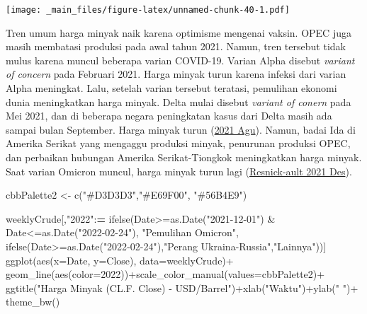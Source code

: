 \documentclass[
]{book}
\newenvironment{Shaded}{\begin{snugshade}}{\end{snugshade}}
\newcommand{\AttributeTok}[1]{\textcolor[rgb]{0.77,0.63,0.00}{#1}}
\newcommand{\ErrorTok}[1]{\textcolor[rgb]{0.64,0.00,0.00}{\textbf{#1}}}
\newcommand{\FunctionTok}[1]{\textcolor[rgb]{0.00,0.00,0.00}{#1}}
\newcommand{\NormalTok}[1]{#1}
\newcommand{\OtherTok}[1]{\textcolor[rgb]{0.56,0.35,0.01}{#1}}
\newcommand{\SpecialCharTok}[1]{\textcolor[rgb]{0.00,0.00,0.00}{#1}}
\newcommand{\StringTok}[1]{\textcolor[rgb]{0.31,0.60,0.02}{#1}}
\begin{document}
\texttt{[image: \_main\_files/figure-latex/unnamed-chunk-40-1.pdf]}

Tren umum harga minyak naik karena optimisme mengenai vaksin. OPEC juga masih membatasi produksi pada awal tahun 2021. Namun, tren tersebut tidak mulus karena muncul beberapa varian COVID-19. Varian Alpha disebut \emph{variant of concern} pada Februari 2021. Harga minyak turun karena infeksi dari varian Alpha meningkat. Lalu, setelah varian tersebut teratasi, pemulihan ekonomi dunia meningkatkan harga minyak. Delta mulai disebut \emph{variant of conern} pada Mei 2021, dan di beberapa negara peningkatan kasus dari Delta masih ada sampai bulan September. Harga minyak turun (\protect\hyperlink{ref-reu_oil_2021}{2021 Agu}). Namun, badai Ida di Amerika Serikat yang mengaggu produksi minyak, penurunan produksi OPEC, dan perbaikan hubungan Amerika Serikat-Tiongkok meningkatkan harga minyak. Saat varian Omicron muncul, harga minyak turun lagi (\protect\hyperlink{ref-resnick-ault_oil_2021}{Resnick-ault 2021 Des}).

\begin{Shaded}
\begin{Highlighting}[]
\NormalTok{cbbPalette2 }\OtherTok{\textless{}{-}} \FunctionTok{c}\NormalTok{(}\StringTok{"\#D3D3D3"}\NormalTok{,}\StringTok{"\#E69F00"}\NormalTok{, }\StringTok{"\#56B4E9"}\NormalTok{)}

\NormalTok{weeklyCrude[,}\StringTok{"2022"}\SpecialCharTok{:}\ErrorTok{=}
              \FunctionTok{ifelse}\NormalTok{(Date}\SpecialCharTok{\textgreater{}=}\FunctionTok{as.Date}\NormalTok{(}\StringTok{"2021{-}12{-}01"}\NormalTok{) }\SpecialCharTok{\&}\NormalTok{ Date}\SpecialCharTok{\textless{}=}\FunctionTok{as.Date}\NormalTok{(}\StringTok{"2022{-}02{-}24"}\NormalTok{),}
                     \StringTok{"Pemulihan Omicron"}\NormalTok{,}
              \FunctionTok{ifelse}\NormalTok{(Date}\SpecialCharTok{\textgreater{}=}\FunctionTok{as.Date}\NormalTok{(}\StringTok{"2022{-}02{-}24"}\NormalTok{),}\StringTok{"Perang Ukraina{-}Russia"}\NormalTok{,}\StringTok{"Lainnya"}\NormalTok{))]}
\FunctionTok{ggplot}\NormalTok{(}\FunctionTok{aes}\NormalTok{(}\AttributeTok{x=}\NormalTok{Date, }\AttributeTok{y=}\NormalTok{Close),}
       \AttributeTok{data=}\NormalTok{weeklyCrude)}\SpecialCharTok{+}
  \FunctionTok{geom\_line}\NormalTok{(}\FunctionTok{aes}\NormalTok{(}\AttributeTok{color=}\StringTok{\textasciigrave{}}\AttributeTok{2022}\StringTok{\textasciigrave{}}\NormalTok{))}\SpecialCharTok{+}\FunctionTok{scale\_color\_manual}\NormalTok{(}\AttributeTok{values=}\NormalTok{cbbPalette2)}\SpecialCharTok{+}
  \FunctionTok{ggtitle}\NormalTok{(}\StringTok{"Harga Minyak (CL.F. Close) {-} USD/Barrel"}\NormalTok{)}\SpecialCharTok{+}\FunctionTok{xlab}\NormalTok{(}\StringTok{"Waktu"}\NormalTok{)}\SpecialCharTok{+}\FunctionTok{ylab}\NormalTok{(}\StringTok{" "}\NormalTok{)}\SpecialCharTok{+}
  \FunctionTok{theme\_bw}\NormalTok{()}
\end{Highlighting}
\end{Shaded}
\end{document}
